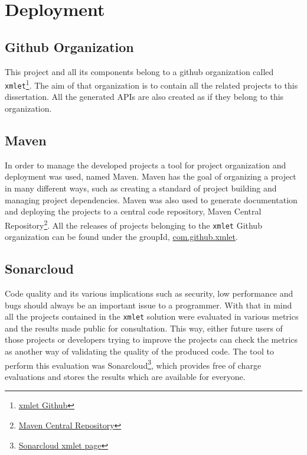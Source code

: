 \chapter{Deployment}
\label{cha:deployment}

\section{Github Organization} %
\label{sec:github}

This project and all its components belong to a github organization called \texttt{xmlet}\footnote{\href{https://github.com/xmlet}{xmlet Github}}. The aim of that organization is to contain all the related projects to this dissertation. All the generated \ac{API}s are also created as if they belong to this organization. 

\section{Maven} %
\label{sec:maven}

In order to manage the developed projects a tool for project organization and deployment was used, named Maven. Maven has the goal of organizing a project in many different ways, such as creating a standard of project building and managing project dependencies. Maven was also used to generate documentation and deploying the projects to a central code repository, Maven Central Repository\footnote{\href{https://search.maven.org/}{Maven Central Repository}}. All the releases of projects belonging to the \texttt{xmlet} Github organization can be found under the groupId, \href{https://search.maven.org/#search%7Cga%7C1%7Ccom.github.xmlet}{com.github.xmlet}. 

\section{Sonarcloud} %
\label{sec:sonarcloud}

Code quality and its various implications such as security, low performance and bugs should always be an important issue to a programmer. With that in mind all the projects contained in the \texttt{xmlet} solution were evaluated in various metrics and the results made public for consultation. This way, either future users of those projects or developers trying to improve the projects can check the metrics as another way of validating the quality of the produced code. The tool to perform this evaluation was Sonarcloud\footnote{\href{https://sonarcloud.io/organizations/xmlet/projects}{Sonarcloud xmlet page}}, which provides free of charge evaluations and stores the results which are available for everyone.

